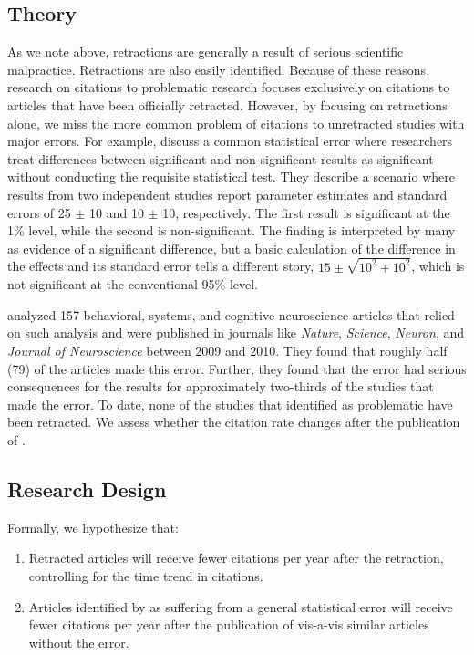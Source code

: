 \documentclass[12pt, letterpaper]{article}
\begin{document}
\subsection{Theory}
As we note above, retractions are generally a result of serious scientific malpractice. Retractions are also easily identified. Because of these reasons, research on citations to problematic research focuses exclusively on citations to articles that have been officially retracted. However, by focusing on retractions alone, we miss the more common problem of citations to unretracted studies with major errors. For example, \citet{gelman2006} discuss a common statistical error where researchers treat differences between significant and non-significant results as significant without conducting the requisite statistical test. They describe a scenario where results from two independent studies report parameter estimates and standard errors of 25 $\pm$ 10 and 10 $\pm$ 10, respectively. The first result is significant at the 1\% level, while the second is non-significant. The finding is interpreted by many as evidence of a significant difference, but a basic calculation of the difference in the effects and its standard error tells a different story, $15 \pm \sqrt{10^{2} + 10^{2}}$, which is not significant at the conventional 95\% level.

\citet{nieuwenhuis2011} analyzed 157 behavioral, systems, and cognitive neuroscience articles that relied on such analysis and were published in journals like \textit{Nature}, \textit{Science}, \textit{Neuron}, and \textit{Journal of Neuroscience} between 2009 and 2010. They found that roughly half (79) of the articles made this error. Further, they found that the error had serious consequences for the results for approximately two-thirds of the studies that made the error. To date, none of the studies that \citet{nieuwenhuis2011} identified as problematic have been retracted. We assess whether the citation rate changes after the publication of \citet{nieuwenhuis2011}.
\subsection{Research Design}
Formally, we hypothesize that:
\begin{enumerate}
    \item Retracted articles will receive fewer citations per year after the retraction, controlling for the time trend in citations.
    \item Articles identified by \citet{nieuwenhuis2011} as suffering from a general statistical error will receive fewer citations per year after the publication of  \citet{nieuwenhuis2011} vis-a-vis similar articles without the error.
\end{enumerate}
\end{document}
